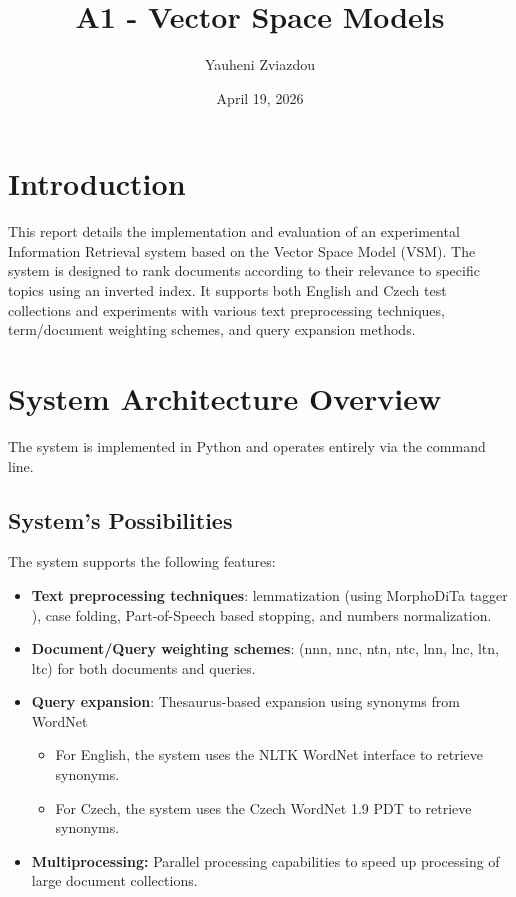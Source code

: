 \documentclass[a4paper, 12pt]{article}
\title{A1 - Vector Space Models}
\author{Yauheni Zviazdou}
\date{April 19, 2026}
\begin{document}
\maketitle

\section{Introduction}

This report details the implementation and evaluation of an experimental Information Retrieval system based on the Vector Space Model (VSM).
The system is designed to rank documents according to their relevance to specific topics using an inverted index.
It supports both English and Czech test collections and experiments with various text preprocessing techniques, term/document weighting schemes, and query expansion methods.

\section{System Architecture Overview}

The system is implemented in Python and operates entirely via the command line.

\subsection{System's Possibilities}

The system supports the following features:
\begin{itemize}
    \item \textbf{Text preprocessing techniques}: lemmatization (using MorphoDiTa tagger \cite{strakova14}), case folding, Part-of-Speech based stopping, and numbers normalization.
    \item \textbf{Document/Query weighting schemes}: (nnn, nnc, ntn, ntc, lnn, lnc, ltn, ltc) for both documents and queries.
    \item \textbf{Query expansion}: Thesaurus-based expansion using synonyms from WordNet
    \begin{itemize}
        \item For English, the system uses the NLTK WordNet \cite{bird-loper-2004-nltk} interface to retrieve synonyms.
        \item For Czech, the system uses the Czech WordNet 1.9 PDT \cite{11858/00-097C-0000-0001-4880-3} to retrieve synonyms.
    \end{itemize}
    \item \textbf{Multiprocessing:} Parallel processing capabilities to speed up processing of large document collections.
\end{itemize}
\end{document}
